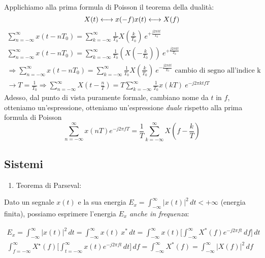 \documentclass[
  paper=a4,
  ,captions=tableheading
]{scrartcl}
\providecommand{\tightlist}{%
  \setlength{\itemsep}{0pt}\setlength{\parskip}{0pt}}
\begin{document}
\begin{enumerate}
  Applichiamo alla prima formula di Poisson il teorema della dualità: \[
  X(t) \longleftrightarrow x(-f) \\
  x(t) \longleftrightarrow X(f)
  \] \begin{gather*}
  \sum_{n=-\infty}^{\infty}x(t-nT_0) = \sum_{k=-\infty}^{\infty} \frac{1}{T_0} X(\frac{k}{T_0})\ e^{+\frac{j2\pi kt}{T_0}} \\
  \sum_{n=-\infty}^{\infty}x(t-nT_0) = \sum_{k=-\infty}^{\infty} \frac{1}{T_0}(X(-\frac{k}{T_0}))\ e^{+\frac{j2\pi kt}{T_0}} \\
  \Rightarrow \sum_{n=-\infty}^{\infty}x(t-nT_0) = \sum_{k=-\infty}^{\infty} \frac{1}{T_0} X(\frac{k}{T_0})\ e^{-\frac{j2\pi kt}{T_0}} \text{ cambio di segno all'indice k} \\
  \to T = \frac{1}{T_0} \Rightarrow \sum_{n=-\infty}^{\infty}X(t-\frac{n}{T}) = T\sum_{k=-\infty}^{\infty} \frac{1}{T_0} x(kT)\ e^{-j2\pi ktfT}
  \end{gather*} Adesso, dal punto di vista puramente formale, cambiano
  nome da \(t\) in \(f\), otteniamo un'espressione, otteniamo
  un'espressione \emph{duale} rispetto alla prima formula di Poisson \[
  \sum_{n=-\infty}^{\infty}x(nT)e^{-j2\pi fT} = \frac{1}{T}\sum_{k=-\infty}^{\infty}X(f-\frac{k}{T})
  \]
\end{enumerate}

\subsection{Sistemi}\label{sistemi}

\begin{enumerate}
\def\labelenumi{\arabic{enumi}.}
\setcounter{enumi}{25}
\tightlist
\item
  Teorema di Parseval:
\end{enumerate}

Dato un segnale \(x(t)\) e la sua energia
\(E_{x}=\int_{-\infty}^{\infty} |x(t)|^2 \,dt < +\infty\) (energia
finita), possiamo esprimere l'energia \(E_x\) \emph{anche in frequenza}:

\begin{gather*}
E_{x}=\int_{-\infty}^{\infty} |x(t)|^2 \,dt = \int_{-\infty}^{\infty} x(t) \ x^{\ast} \,dt = \int_{-\infty}^{\infty} x(t) \Big[ \int_{-\infty}^{\infty} X^{*}(f) e^{-j2\pi ft} \,df \Big] \,dt \\
\int_{f=-\infty}^{\infty} X^{\star}(f) \Big [\int_{t=-\infty}^{\infty} x(t) e^{-j2\pi ft} \,dt\Big ] \,df = \int_{-\infty}^{\infty} X^{*}(f) = \int_{-\infty}^{\infty} |X(f)|^{2} \,df
\end{gather*}
\end{document}
